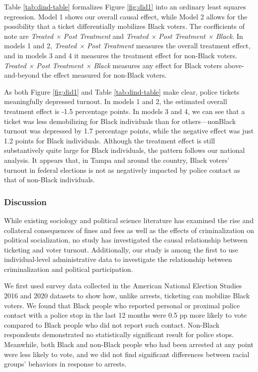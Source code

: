 \documentclass[
  12pt,
]{article}
\begin{document}
Table \ref{tab:dind-table} formalizes Figure \ref{fig:did1} into an ordinary least squares regression. Model 1 shows our overall causal effect, while Model 2 allows for the possibility that a ticket differentially mobilizes Black voters. The coefficients of note are \emph{Treated × Post Treatment} and \emph{Treated × Post Treatment × Black}. In models 1 and 2, \emph{Treated × Post Treatment} measures the overall treatment effect, and in models 3 and 4 it measures the treatment effect for non-Black voters. \emph{Treated × Post Treatment × Black} measures any effect for Black voters above-and-beyond the effect measured for non-Black voters.

\begin{singlespace}

\end{singlespace}

As both Figure \ref{fig:did1} and Table \ref{tab:dind-table} make clear, police tickets meaningfully depressed turnout. In models 1 and 2, the estimated overall treatment effect is -1.5 percentage points. In models 3 and 4, we can see that a ticket was less demobilizing for Black individuals than for others---nonBlack turnout was depressed by 1.7 percentage points, while the negative effect was just 1.2 points for Black individuals. Although the treatment effect is still substantively quite large for Black individuals, the pattern follows our national analysis. It appears that, in Tampa and around the country, Black voters' turnout in federal elections is not as negatively impacted by police contact as that of non-Black individuals.

\hypertarget{discussion}{%
\subsubsection*{Discussion}\label{discussion}}

While existing sociology and political science literature has examined the rise and collateral consequences of fines and fees as well as the effects of criminalization on political socialization, no study has investigated the causal relationship between ticketing and voter turnout. Additionally, our study is among the first to use individual-level administrative data to investigate the relationship between criminalization and political participation.

We first used survey data collected in the American National Election Studies 2016 and 2020 datasets to show how, unlike arrests, ticketing can mobilize Black voters. We found that Black people who reported personal or proximal police contact with a police stop in the last 12 months were 0.5 pp more likely to vote compared to Black people who did not report such contact. Non-Black respondents demonstrated no statistically significant result for police stops. Meanwhile, both Black and non-Black people who had been arrested at any point were less likely to vote, and we did not find significant differences between racial groups' behaviors in response to arrests.
\end{document}
